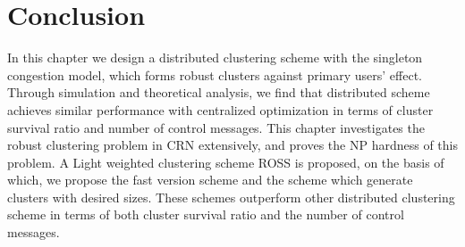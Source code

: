 \documentclass[journal,comsoc]{IEEEtran}
\theoremstyle{mytheoremstyle}
\theoremstyle{mytheoremstyle}
\theoremstyle{mytheoremstyle}
\begin{document}
%
%
%


\section{Conclusion}
\label{conclusion}
In this chapter we design a distributed clustering scheme with the singleton congestion model, which forms robust clusters against primary users' effect.
Through simulation and theoretical analysis, we find that distributed scheme achieves similar performance with centralized optimization in terms of cluster survival ratio and number of control messages.
This chapter investigates the robust clustering problem in CRN extensively, and proves the NP hardness of this problem.
A Light weighted clustering scheme ROSS is proposed, on the basis of which, we propose the fast version scheme and the scheme which generate clusters with desired sizes.
These schemes outperform other distributed clustering scheme in terms of both cluster survival ratio and the number of control messages.

\end{document}
